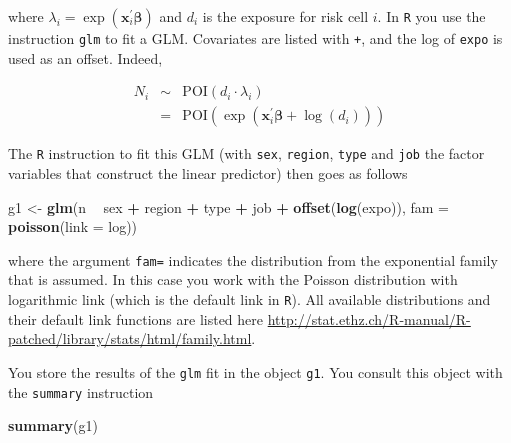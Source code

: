 \documentclass[
]{book}
\newenvironment{Shaded}{\begin{snugshade}}{\end{snugshade}}
\newcommand{\DataTypeTok}[1]{\textcolor[rgb]{0.13,0.29,0.53}{#1}}
\newcommand{\KeywordTok}[1]{\textcolor[rgb]{0.13,0.29,0.53}{\textbf{#1}}}
\newcommand{\NormalTok}[1]{#1}
\newcommand{\OperatorTok}[1]{\textcolor[rgb]{0.81,0.36,0.00}{\textbf{#1}}}
\newcommand{\StringTok}[1]{\textcolor[rgb]{0.31,0.60,0.02}{#1}}
\begin{document}
where \(\lambda_i = \exp{(\boldsymbol{x}^{'}_i\boldsymbol{\beta})}\) and \(d_i\) is the exposure for risk cell \(i\). In \texttt{R} you use the instruction \texttt{glm} to fit a GLM. Covariates are listed with \texttt{+}, and the log of \texttt{expo} is used as an offset. Indeed,

\begin{eqnarray*}
N_i &\sim& \text{POI}(d_i \cdot \lambda_i) \\
&= & \text{POI}(\exp{(\boldsymbol{x}^{'}_i \boldsymbol{\beta}+\log{(d_i)})})
\end{eqnarray*}

The \texttt{R} instruction to fit this GLM (with \texttt{sex}, \texttt{region}, \texttt{type} and \texttt{job} the factor variables that construct the linear predictor) then goes as follows

\begin{Shaded}
\begin{Highlighting}[]
\NormalTok{g1 <-}\StringTok{ }\KeywordTok{glm}\NormalTok{(n }\OperatorTok{~}\StringTok{ }\NormalTok{sex }\OperatorTok{+}\StringTok{ }\NormalTok{region }\OperatorTok{+}\StringTok{ }\NormalTok{type }\OperatorTok{+}\StringTok{ }\NormalTok{job }\OperatorTok{+}\StringTok{ }\KeywordTok{offset}\NormalTok{(}\KeywordTok{log}\NormalTok{(expo)), }\DataTypeTok{fam =} \KeywordTok{poisson}\NormalTok{(}\DataTypeTok{link =}\NormalTok{ log))}
\end{Highlighting}
\end{Shaded}

where the argument \texttt{fam=} indicates the distribution from the exponential family that is assumed. In this case you work with the Poisson distribution with logarithmic link (which is the default link in \texttt{R}). All available distributions and their default link functions are listed here \url{http://stat.ethz.ch/R-manual/R-patched/library/stats/html/family.html}.

You store the results of the \texttt{glm} fit in the object \texttt{g1}. You consult this object with the \texttt{summary} instruction

\begin{Shaded}
\begin{Highlighting}[]
\KeywordTok{summary}\NormalTok{(g1)}
\end{Highlighting}
\end{Shaded}
\end{document}
